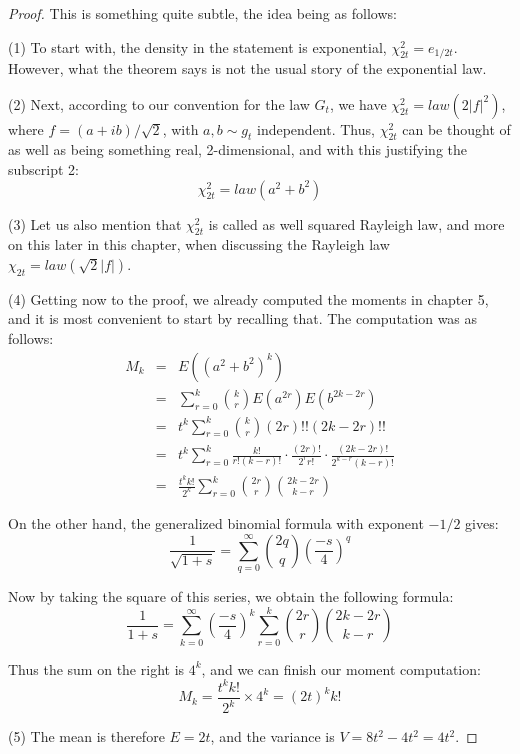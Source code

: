 \documentclass[12pt]{amsbook}
\begin{document}
\begin{proof}
This is something quite subtle, the idea being as follows:

\medskip

(1) To start with, the density in the statement is exponential, $\chi_{2t}^2=e_{1/2t}$. However, what the theorem says is not the usual story of the exponential law.

\medskip

(2) Next, according to our convention for the law $G_t$, we have $\chi_{2t}^2=law(2|f|^2)$, where $f=(a+ib)/\sqrt{2}$, with $a,b\sim g_t$ independent. Thus, $\chi_{2t}^2$ can be thought of as well as being something real, 2-dimensional, and with this justifying the subscript 2:
$$\chi_{2t}^2=law(a^2+b^2)$$

(3) Let us also mention that $\chi_{2t}^2$ is called as well squared Rayleigh law, and more on this later in this chapter, when discussing the Rayleigh law $\chi_{2t}=law(\sqrt{2}|f|)$. 

\medskip

(4) Getting now to the proof, we already computed the moments in chapter 5, and it is most convenient to start by recalling that. The computation was as follows:
\begin{eqnarray*}
M_k
&=&E\left((a^2+b^2)^k\right)\\
&=&\sum_{r=0}^k\binom{k}{r}E(a^{2r})E(b^{2k-2r})\\
&=&t^k\sum_{r=0}^k\binom{k}{r}(2r)!!(2k-2r)!!\\
&=&t^k\sum_{r=0}^k\frac{k!}{r!(k-r)!}\cdot\frac{(2r)!}{2^rr!}\cdot\frac{(2k-2r)!}{2^{k-r}(k-r)!}\\
&=&\frac{t^kk!}{2^k}\sum_{r=0}^k\binom{2r}{r}\binom{2k-2r}{k-r}
\end{eqnarray*}

On the other hand, the generalized binomial formula with exponent $-1/2$ gives:
$$\frac{1}{\sqrt{1+s}}=\sum_{q=0}^\infty\binom{2q}{q}\left(\frac{-s}{4}\right)^q$$

Now by taking the square of this series, we obtain the following formula:
$$\frac{1}{1+s}
=\sum_{k=0}^\infty\left(\frac{-s}{4}\right)^k\sum_{r=0}^k\binom{2r}{r}\binom{2k-2r}{k-r}$$

Thus the sum on the right is $4^k$, and we can finish our moment computation:
$$M_k=\frac{t^kk!}{2^k}\times 4^k=(2t)^kk!$$

(5) The mean is therefore $E=2t$, and the variance is $V=8t^2-4t^2=4t^2$.

\medskip


\end{proof}
\end{document}
